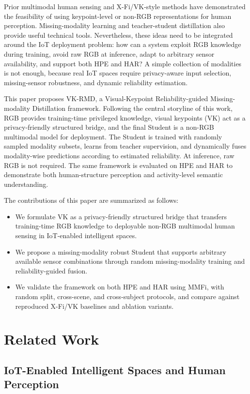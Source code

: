 \documentclass[journal]{IEEEtran}
\begin{document}
Prior multimodal human sensing and X-Fi/VK-style methods have demonstrated the feasibility of using keypoint-level or non-RGB representations for human perception. Missing-modality learning and teacher-student distillation also provide useful technical tools. Nevertheless, these ideas need to be integrated around the IoT deployment problem: how can a system exploit RGB knowledge during training, avoid raw RGB at inference, adapt to arbitrary sensor availability, and support both HPE and HAR? A simple collection of modalities is not enough, because real IoT spaces require privacy-aware input selection, missing-sensor robustness, and dynamic reliability estimation.

This paper proposes VK-RMD, a Visual-Keypoint Reliability-guided Missing-modality Distillation framework. Following the central storyline of this work, RGB provides training-time privileged knowledge, visual keypoints (VK) act as a privacy-friendly structured bridge, and the final Student is a non-RGB multimodal model for deployment. The Student is trained with randomly sampled modality subsets, learns from teacher supervision, and dynamically fuses modality-wise predictions according to estimated reliability. At inference, raw RGB is not required. The same framework is evaluated on HPE and HAR to demonstrate both human-structure perception and activity-level semantic understanding.

The contributions of this paper are summarized as follows:
\begin{itemize}
    \item We formulate VK as a privacy-friendly structured bridge that transfers training-time RGB knowledge to deployable non-RGB multimodal human sensing in IoT-enabled intelligent spaces.
    \item We propose a missing-modality robust Student that supports arbitrary available sensor combinations through random missing-modality training and reliability-guided fusion.
    \item We validate the framework on both HPE and HAR using MMFi, with random split, cross-scene, and cross-subject protocols, and compare against reproduced X-Fi/VK baselines and ablation variants.
\end{itemize}

\section{Related Work}

\subsection{IoT-Enabled Intelligent Spaces and Human Perception}
\end{document}
